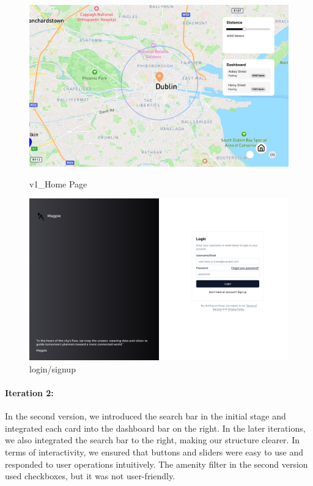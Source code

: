 \begin{figure}[h]
    \centering
    \begin{minipage}{0.48\textwidth}
        \centering
        \includegraphics[width=\textwidth]{images/v1_Home Page.png}
        \caption{v1_Home Page}
        \label{fig:v1_Home Page}
    \end{minipage}
    \hfill
    \begin{minipage}{0.48\textwidth}
        \centering
        \includegraphics[width=\textwidth]{images/v1_Login.png}
        \caption{login/signup}
        \label{fig:v1_Login}
    \end{minipage}
\end{figure}


\paragraph{Iteration 2:}
In the second version, we introduced the search bar in the initial stage and integrated each card into the dashboard bar on the right. In the later iterations, we also integrated the search bar to the right, making our structure clearer. In terms of interactivity, we ensured that buttons and sliders were easy to use and responded to user operations intuitively. The amenity filter in the second version used checkboxes, but it was not user-friendly.


